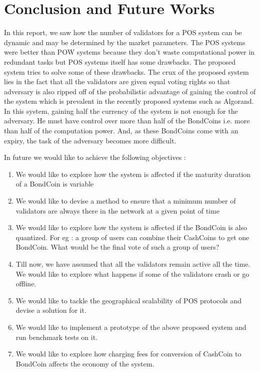
\chapter{Conclusion and Future Works} %

\label{Chapter 5} %


In this report, we saw how the number of validators for a POS system can be dynamic and may be determined by the market parameters. The POS systems were better than POW systems because they don't waste computational power in redundant tasks but POS systems itself has some drawbacks. The proposed system tries to solve some of these drawbacks. The crux of the proposed system lies in the fact that all the validators are given equal voting rights so that adversary is also ripped off of the probabilistic advantage of gaining the control of the system which is prevalent in the recently proposed systems such as Algorand. In this system, gaining half the currency of the system is not enough for the adversary. He must have control over more than half of the BondCoins i.e. more than half of the computation power. And, as these BondCoins come with an expiry, the task of the adversary becomes more difficult.

In future we would like to achieve the following objectives :
\begin{enumerate}
    \item We would like to explore how the system is affected if the maturity duration of a BondCoin is variable
    \item We would like to devise a method to ensure that a minimum number of validators are always there in the network at a given point of time
    \item We would like to explore how the system is affected if the BondCoin is also quantized. For eg : a group of users can combine their CashCoins to get one BondCoin. What would be the final vote of such a group of users?
    \item Till now, we have assumed that all the validators remain active all the time. We would like to explore what happens if some of the validators crash or go offline.
    \item We would like to tackle the geographical scalability of POS protocols and devise a solution for it.
    \item We would like to implement a prototype of the above proposed system and run benchmark tests on it.
    \item We would like to explore how charging fees for conversion of CashCoin to BondCoin affects the economy of the system.
\end{enumerate}
